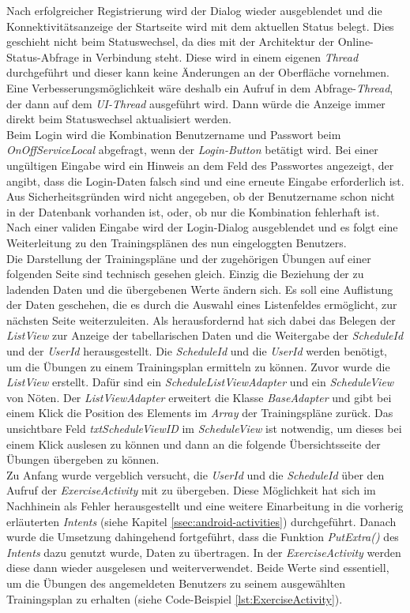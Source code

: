 Nach erfolgreicher Registrierung wird der Dialog wieder ausgeblendet und die Konnektivitätsanzeige der Startseite wird mit dem aktuellen Status belegt. Dies geschieht nicht beim Statuswechsel, da dies mit der Architektur der Online-Status-Abfrage in Verbindung steht. Diese wird in einem eigenen \textit{Thread} durchgeführt und dieser kann keine Änderungen an der Oberfläche vornehmen. Eine Verbesserungsmöglichkeit wäre deshalb ein Aufruf in dem Abfrage-\textit{Thread}, der dann auf dem \textit{UI-Thread} ausgeführt wird. Dann würde die Anzeige immer direkt beim Statuswechsel aktualisiert werden.\\
Beim Login wird die Kombination Benutzername und Passwort beim \textit{OnOffServiceLocal} abgefragt, wenn der \textit{Login-Button} betätigt wird. Bei einer ungültigen Eingabe wird ein Hinweis an dem Feld des Passwortes angezeigt, der angibt, dass die Login-Daten falsch sind und eine erneute Eingabe erforderlich ist. Aus Sicherheitsgründen wird nicht angegeben, ob der Benutzername schon nicht in der Datenbank vorhanden ist, oder, ob nur die Kombination fehlerhaft ist. Nach einer validen Eingabe wird der Login-Dialog ausgeblendet und es folgt eine Weiterleitung zu den Trainingsplänen des nun eingeloggten Benutzers.\\
Die Darstellung der Trainingspläne und der zugehörigen Übungen auf einer folgenden Seite sind technisch gesehen gleich. Einzig die Beziehung der zu ladenden Daten und die übergebenen Werte ändern sich. Es soll eine Auflistung der Daten geschehen, die es durch die Auswahl eines Listenfeldes ermöglicht, zur nächsten Seite weiterzuleiten. Als herausfordernd hat sich dabei das Belegen der \textit{ListView} zur Anzeige der tabellarischen Daten und die Weitergabe der \textit{ScheduleId} und der \textit{UserId} herausgestellt. Die \textit{ScheduleId} und die \textit{UserId} werden benötigt, um die Übungen zu einem Trainingsplan ermitteln zu können. Zuvor wurde die \textit{ListView} erstellt. Dafür sind ein \textit{ScheduleListViewAdapter} und ein \textit{ScheduleView} von Nöten. Der \textit{ListViewAdapter} erweitert die Klasse \textit{BaseAdapter} und gibt bei einem Klick die Position des Elements im \textit{Array} der Trainingspläne zurück. Das unsichtbare Feld \textit{txtScheduleViewID} im \textit{ScheduleView} ist notwendig, um dieses bei einem Klick auslesen zu können und dann an die folgende Übersichtsseite der Übungen übergeben zu können.\\
Zu Anfang wurde vergeblich versucht, die \textit{UserId} und die \textit{ScheduleId} über den Aufruf der \textit{ExerciseActivity} mit zu übergeben. Diese Möglichkeit hat sich im Nachhinein als Fehler herausgestellt und eine weitere Einarbeitung in die vorherig erläuterten \textit{Intents} (siehe Kapitel \ref{ssec:android-activities}) durchgeführt. Danach wurde die Umsetzung dahingehend fortgeführt, dass die Funktion \textit{PutExtra()} des \textit{Intents} dazu genutzt wurde, Daten zu übertragen. In der \textit{ExerciseActivity} werden diese dann wieder ausgelesen und weiterverwendet. Beide Werte sind essentiell, um die Übungen des angemeldeten Benutzers zu seinem ausgewählten Trainingsplan zu erhalten (siehe Code-Beispiel \ref{lst:ExerciseActivity}).\\
